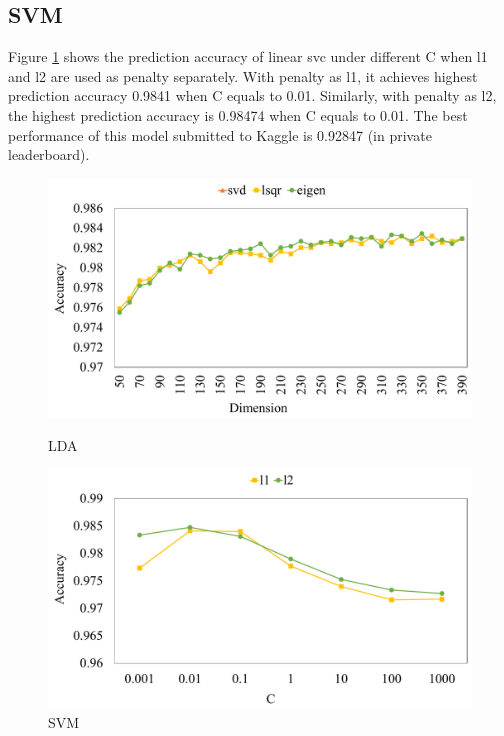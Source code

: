 \documentclass[10pt,journal,compsoc]{IEEEtran}
\begin{document}
\subsection{SVM}
\label{subsec:eva_svm}
Figure \ref{fig:svm} shows the prediction accuracy of linear svc under different C when l1 and l2 are used as penalty separately. With penalty as l1, it achieves highest prediction accuracy 0.9841 when C equals to 0.01. Similarly, with penalty as l2, the highest prediction accuracy is 0.98474 when C equals to 0.01. The best performance of this model submitted to Kaggle is 0.92847 (in private leaderboard).
 
\begin{figure}[!t]
  \centering
  \begin{minipage}[t]{0.225\textwidth}
    \centering
    \includegraphics[width=1\textwidth]{images/lda}
    \caption{LDA}
    \label{fig:lda}
  \end{minipage}
  \begin{minipage}[t]{0.225\textwidth}
    \centering
    \includegraphics[width=1\textwidth]{images/linsvm}
    \caption{SVM}
    \label{fig:svm}
  \end{minipage}
\end{figure}
\end{document}
